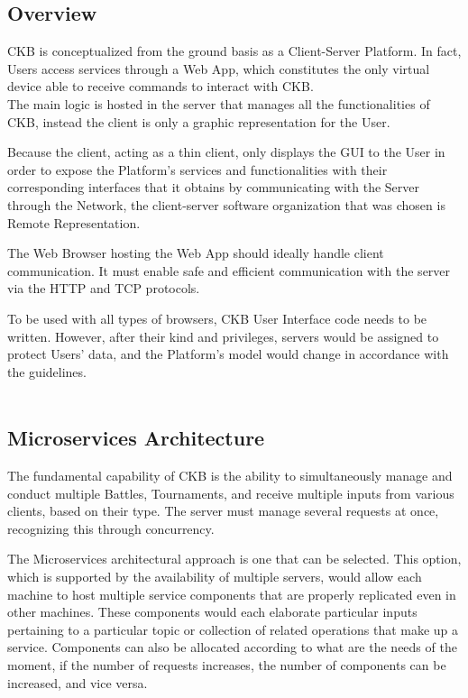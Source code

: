 \subsection{Overview}
CKB is conceptualized from the ground basis as a Client-Server Platform. In fact, Users access services through a Web App, which constitutes the only virtual device able to receive commands to interact 
with CKB.
\\
The main logic is hosted in the server that manages all the functionalities of CKB, instead the client is only a graphic representation for the User.

Because the client, acting as a thin client, only displays the GUI to the User in order to expose the Platform's services and functionalities with their corresponding interfaces that it obtains by communicating with the Server through 
the Network, the client-server software organization that was chosen is Remote Representation.

The Web Browser hosting the Web App should ideally handle client communication. It must enable safe and efficient communication with the server via the HTTP and TCP protocols. 

To be used with all types of browsers, CKB User Interface code needs to be written. However, after their kind and privileges, servers would be assigned to protect Users' data, and the Platform's model would change in accordance 
with the guidelines.\\
\\
\subsection*{Microservices Architecture}
The fundamental capability of CKB is the ability to simultaneously manage and conduct multiple Battles, Tournaments, and receive multiple inputs from various clients, based on their type. 
The server must manage several requests at once, recognizing this through concurrency.

The Microservices architectural approach is one that can be selected. 
This option, which is supported by the availability of multiple servers, would allow each machine to host multiple service components that are properly replicated even in other machines. 
These components would each elaborate particular inputs pertaining to a particular topic or collection of related operations that make up a service.
Components can also be allocated according to what are the needs of the moment, if the number of requests increases, the number of components can be increased, and vice versa.

